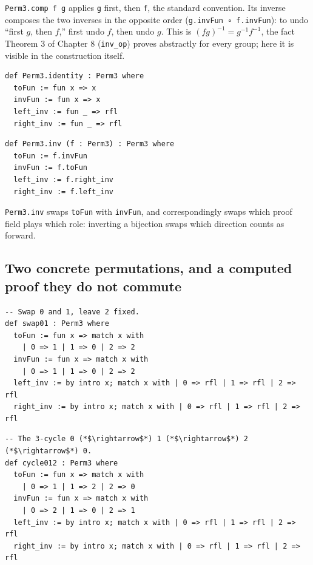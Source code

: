 \texttt{Perm3.comp f g} applies \texttt{g} first, then \texttt{f}, the standard convention. Its inverse composes the two inverses in the opposite order (\texttt{g.invFun ∘ f.invFun}): to undo ``first \(g\), then \(f\),'' first undo \(f\), then undo \(g\). This is \((fg)^{-1} = g^{-1}f^{-1}\), the fact Theorem 3 of Chapter 8 (\texttt{inv\_\allowbreak{}op}) proves abstractly for every group; here it is visible in the construction itself.

\begin{lstlisting}
def Perm3.identity : Perm3 where
  toFun := fun x => x
  invFun := fun x => x
  left_inv := fun _ => rfl
  right_inv := fun _ => rfl
\end{lstlisting}

\begin{lstlisting}
def Perm3.inv (f : Perm3) : Perm3 where
  toFun := f.invFun
  invFun := f.toFun
  left_inv := f.right_inv
  right_inv := f.left_inv
\end{lstlisting}

\texttt{Perm3.inv} swaps \texttt{toFun} with \texttt{invFun}, and correspondingly swaps which proof field plays which role: inverting a bijection swaps which direction counts as forward.

\subsection{Two concrete permutations, and a computed proof they do not commute}\label{sec:07-groups:04-permutations-example:4}

\begin{lstlisting}
-- Swap 0 and 1, leave 2 fixed.
def swap01 : Perm3 where
  toFun := fun x => match x with
    | 0 => 1 | 1 => 0 | 2 => 2
  invFun := fun x => match x with
    | 0 => 1 | 1 => 0 | 2 => 2
  left_inv := by intro x; match x with | 0 => rfl | 1 => rfl | 2 => rfl
  right_inv := by intro x; match x with | 0 => rfl | 1 => rfl | 2 => rfl
\end{lstlisting}

\begin{lstlisting}
-- The 3-cycle 0 (*$\rightarrow$*) 1 (*$\rightarrow$*) 2 (*$\rightarrow$*) 0.
def cycle012 : Perm3 where
  toFun := fun x => match x with
    | 0 => 1 | 1 => 2 | 2 => 0
  invFun := fun x => match x with
    | 0 => 2 | 1 => 0 | 2 => 1
  left_inv := by intro x; match x with | 0 => rfl | 1 => rfl | 2 => rfl
  right_inv := by intro x; match x with | 0 => rfl | 1 => rfl | 2 => rfl
\end{lstlisting}


